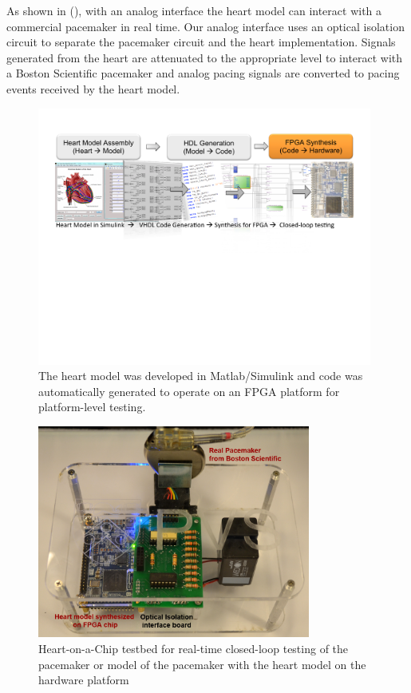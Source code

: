 As shown in (), with an analog interface the heart model can interact with a commercial pacemaker in real time. Our analog interface uses an optical isolation circuit to separate the pacemaker circuit and the heart implementation. Signals generated from the heart are attenuated to the appropriate level to interact with a Boston Scientific pacemaker and analog pacing signals are converted to pacing events received by the heart model. 
\begin{figure}[!t]
\center
		\includegraphics[width=0.98\textwidth]{figs/modeling_heart.pdf}
\caption{The heart model was developed in Matlab/Simulink and code was automatically generated to operate on an FPGA platform for platform-level testing.}
\label{fig:modeling_heart}
\end{figure}
\begin{figure}[!b]
\center
		\includegraphics[width=0.8\textwidth]{figs/PVS.pdf}
\caption{Heart-on-a-Chip testbed for real-time closed-loop testing of the pacemaker or model of the pacemaker with the heart model on the hardware platform}
\label{fig:HOC}
\end{figure}
